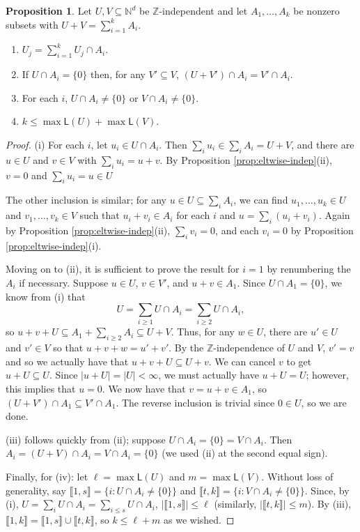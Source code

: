 \documentclass{report}
\newcommand{\NN}{\mathbb{N}}
\newcommand{\ZZ}{\mathbb{Z}}
\newcommand{\llb}{\llbracket}
\newcommand{\rrb}{\rrbracket}
\renewcommand{\:}{\text{:}}
\theoremstyle{definition}
\newtheorem{prop}[defn]{Proposition}
\begin{document}
\begin{prop} \label{prop:indep-decomp}
Let $U,V \subseteq \NN^d$ be $\ZZ$-independent and let $A_1,\dots, A_k$ be nonzero subsets with $U+V = \sum_{i=1}^k A_i$.
\begin{enumerate}[label={\rm (\roman{*})}]
	\item $U_j = \sum_{i=1}^k U_j\cap A_i$.
	\item If $U \cap A_i = \{0\}$ then, for any $V'\subseteq V$, $(U+V')\cap A_i = V'\cap A_i$.
	\item For each $i$, $U\cap A_i \neq \{0\}$ or $V \cap A_i \neq \{0\}$.
	\item $k \le \max \mathsf{L}(U) + \max \mathsf{L}(V)$.
\end{enumerate}
\end{prop}

\begin{proof}
(i) For each $i$, let $u_i\in U\cap A_i$.
Then $\sum_i u_i \in \sum_i A_i = U+V$, and there are $u\in U$ and $v\in V$ with $\sum_i u_i = u+v$.
By Proposition \ref{prop:eltwise-indep}(ii), $v = 0$ and $\sum_i u_i = u \in U$

The other inclusion is similar; for any $u\in U \subseteq \sum_i A_i$, we can find $u_1,\dots,u_k\in U$ and $v_1,\dots, v_k\in V$ such that $u_i+v_i\in A_i$ for each $i$ and $u = \sum_i (u_i + v_i)$.
Again by Proposition \ref{prop:eltwise-indep}(ii), $\sum_i v_i = 0$, and each $v_i = 0$ by Proposition \ref{prop:eltwise-indep}(i).

Moving on to (ii), it is sufficient to prove the result for $i=1$ by renumbering the $A_i$ if necessary.
Suppose $u\in U$, $v\in V'$, and $u+v\in A_1$.
Since $U\cap A_1 = \{0\}$, we know from (i) that
\[ U = \sum_{i\ge 1} U\cap A_i = \sum_{i\ge 2} U\cap A_i, \]
so $u+v + U \subseteq A_1 + \sum_{i\ge 2} A_i \subseteq U+V$.
Thus, for any $w\in U$, there are $u'\in U$ and $v'\in V$ so that $u+v+w = u'+v'$.
By the $\ZZ$-independence of $U$ and $V$, $v' = v$ and so we actually have that $u+v+U \subseteq U + v$.
We can cancel $v$ to get $u+U \subseteq U$.
Since $|u+U| = |U| <\infty$, we must actually have $u+U = U$; however, this implies that $u = 0$.
We now have that $v = u+v \in A_1$, so $(U+V')\cap A_1 \subseteq V' \cap A_1$.
The reverse inclusion is trivial since $0\in U$, so we are done.

(iii) follows quickly from (ii); suppose $U\cap A_i = \{0\} = V\cap A_i$.
Then $A_i = (U+V)\cap A_i = V\cap A_i = \{0\}$ (we used (ii) at the second equal sign).

Finally, for (iv): let $\ell = \max \mathsf{L}(U)$ and $m = \max\mathsf{L}(V)$.
Without loss of generality, say $\llb 1,s \rrb = \{i: U\cap A_i \neq \{0\} \}$ and $\llb t,k \rrb = \{i: V\cap A_i \neq \{0\} \}$.
Since, by (i), $U = \sum_i U\cap A_i = \sum_{i\le s} U \cap A_i$, $| \llb 1,s \rrb | \le \ell$ (similarly, $|\llb t,k \rrb| \le m$).
By (iii), $\llb 1,k \rrb = \llb 1,s \rrb \cup \llb t,k \rrb$, so $k \le \ell + m$ as we wished.
\end{proof}
\end{document}
